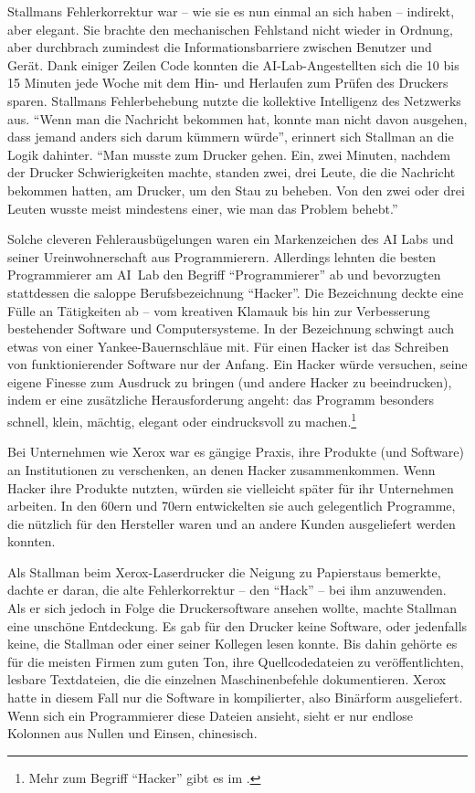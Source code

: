 Stallmans Fehlerkorrektur war – wie sie es nun einmal an sich haben – indirekt, aber elegant. Sie brachte den mechanischen Fehlstand nicht wieder in Ordnung, aber durchbrach zumindest die Informationsbarriere zwischen Benutzer und Gerät. Dank einiger Zeilen Code konnten die AI-Lab-Angestellten sich die 10 bis 15 Minuten jede Woche mit dem Hin- und Herlaufen zum Prüfen des Druckers sparen. 
Stallmans Fehlerbehebung nutzte die kollektive Intelligenz des Netzwerks aus. "`Wenn man die Nachricht bekommen hat, konnte man nicht davon ausgehen, dass jemand anders sich darum kümmern würde"', erinnert sich Stallman an die Logik dahinter. "`Man musste zum Drucker gehen. Ein, zwei Minuten, nachdem der Drucker Schwierigkeiten machte, standen zwei, drei Leute, die die Nachricht bekommen hatten, am Drucker, um den Stau zu beheben. Von den zwei oder drei Leuten wusste meist mindestens einer, wie man das Problem behebt."'

Solche cleveren Fehlerausbügelungen waren ein Markenzeichen des AI Labs und seiner Ureinwohnerschaft aus Programmierern. Allerdings lehnten die besten Programmierer am AI~Lab den Begriff "`Programmierer"' ab und bevorzugten stattdessen die saloppe Berufsbezeichnung "`Hacker"'. Die Bezeichnung deckte eine Fülle an Tätigkeiten ab – vom kreativen Klamauk bis hin zur Verbesserung bestehender Software und Computersysteme. In der Bezeichnung schwingt auch etwas von einer Yankee-Bauernschläue mit.
Für einen Hacker ist das Schreiben von funktionierender Software nur der Anfang. Ein Hacker würde versuchen, seine eigene Finesse zum Ausdruck zu bringen (und andere Hacker zu beeindrucken), indem er eine zusätzliche Herausforderung angeht: das Programm besonders schnell, klein, mächtig, elegant oder eindrucksvoll zu machen.\footnote{Mehr zum Begriff "`Hacker"' gibt es im .}

Bei Unternehmen wie Xerox war es gängige Praxis, ihre Produkte (und Software) an Institutionen zu verschenken, an denen Hacker zusammenkommen. Wenn Hacker ihre Produkte nutzten, würden sie vielleicht später für ihr Unternehmen arbeiten. In den 60ern und 70ern entwickelten sie auch gelegentlich Programme, die nützlich für den Hersteller waren und an andere Kunden ausgeliefert werden konnten. 

Als Stallman beim Xerox-Laserdrucker die Neigung zu Papierstaus bemerkte, dachte er daran, die alte Fehlerkorrektur – den "`Hack"' – bei ihm anzuwenden. Als er sich jedoch in Folge die Druckersoftware ansehen wollte, machte Stallman eine unschöne Entdeckung. Es gab für den Drucker keine Software, oder jedenfalls keine, die Stallman oder einer seiner Kollegen lesen konnte. Bis dahin gehörte es für die meisten Firmen zum guten Ton, ihre Quellcodedateien zu veröffentlichten, lesbare Textdateien, die die einzelnen Maschinenbefehle dokumentieren. Xerox hatte in diesem Fall nur die Software in kompilierter, also Binärform ausgeliefert. Wenn sich ein Programmierer diese Dateien ansieht, sieht er nur endlose Kolonnen aus Nullen und Einsen, chinesisch.

